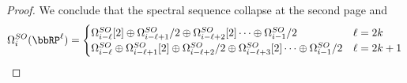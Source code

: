 \begin{proof}
    We conclude that the spectral sequence collapse at the second page and
    \begin{equation*}
        \Omega^{SO}_i(\bbRP^\ell) = \begin{cases}
            \Omega^{SO}_{i-\ell}[2]\oplus  \Omega^{SO}_{i-\ell+1}/2 \oplus \Omega^{SO}_{i-\ell+2}[2] \dots
            \oplus \Omega^{SO}_{i-1}/2 & \ell = 2k \\
            \Omega^{SO}_{i-\ell} \oplus  \Omega^{SO}_{i-\ell+1}[2] \oplus \Omega^{SO}_{i-\ell+2}/2 \oplus \Omega^{SO}_{i-\ell+3}[2] \dots \oplus \Omega^{SO}_{i-1}/2 & \ell=2k+1
        \end{cases}
    \end{equation*}

\end{proof}